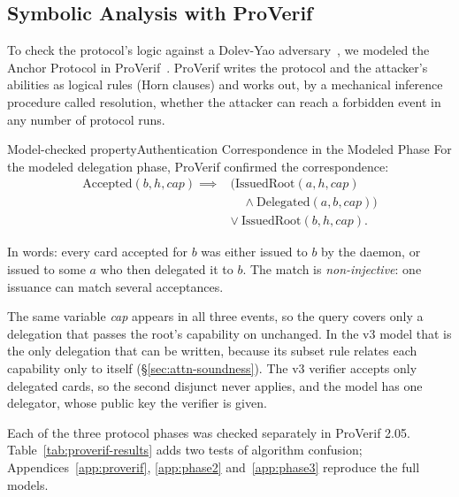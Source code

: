 \documentclass[11pt,a4paper]{article}
\theoremstyle{definition}
\begin{document}
\subsection{Symbolic Analysis with ProVerif}

To check the protocol's logic against a Dolev-Yao adversary~, we modeled the Anchor Protocol in ProVerif~. ProVerif writes the protocol and the attacker's abilities as logical rules (Horn clauses) and works out, by a mechanical inference procedure called resolution, whether the attacker can reach a forbidden event in any number of protocol runs.

\begin{pdclaim}{Model-checked property}{Authentication Correspondence in the Modeled Phase}
\setlength{\parskip}{4pt plus 1pt}
\label{thm:injective}
For the modeled delegation phase, ProVerif confirmed the correspondence:
\begin{align}
\text{Accepted}(b, h, cap) \implies{}&(\text{IssuedRoot}(a, h, cap) \nonumber\\
&\quad \land \text{Delegated}(a, b, cap)) \nonumber\\
& \lor \ \text{IssuedRoot}(b, h, cap).
\end{align}

In words: every card accepted for $b$ was either issued to $b$ by the daemon, or issued to some $a$ who then delegated it to $b$. The match is \emph{non-injective}: one issuance can match several acceptances.

The same variable \textit{cap} appears in all three events, so the query covers only a delegation that passes the root's capability on unchanged. In the v3 model that is the only delegation that can be written, because its subset rule relates each capability only to itself (\S\ref{sec:attn-soundness}). The v3 verifier accepts only delegated cards, so the second disjunct never applies, and the model has one delegator, whose public key the verifier is given.
\end{pdclaim}

Each of the three protocol phases was checked separately in ProVerif 2.05.
Table~\ref{tab:proverif-results} adds two tests of algorithm confusion;
Appendices~\ref{app:proverif}, \ref{app:phase2} and~\ref{app:phase3}
reproduce the full models.
\end{document}

